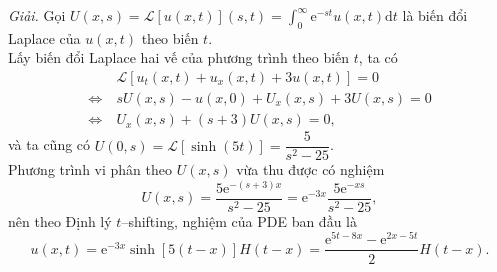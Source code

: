\documentclass[10pt, a4paper]{article}
\begin{document}
	\textit{Giải.} Gọi $U(x,s)=\mathcal L[u(x,t)](s,t)=\displaystyle\int_0^\infty\mathrm e^{-st}u(x,t)\mathrm dt$ là biến đổi Laplace của $u(x,t)$ theo biến $t$.\\
	
	Lấy biến đổi Laplace hai vế của phương trình theo biến $t$, ta có \begin{align*}
		&\mathcal L[u_t(x,t)+u_x(x,t)+3u(x,t)]=0\\
		\Leftrightarrow~&sU(x,s)-u(x,0)+U_x(x,s)+3U(x,s)=0\\
		\Leftrightarrow~&U_x(x,s)+(s+3)U(x,s)=0,
	\end{align*}
	và ta cũng có $U(0,s)=\mathcal L[\sinh(5t)]=\dfrac{5}{s^2-25}$.\\
	
	Phương trình vi phân theo $U(x,s)$ vừa thu được có nghiệm $$U(x,s)=\frac{5\mathrm e^{-(s+3)x}}{s^2-25}=\mathrm e^{-3x}\frac{5\mathrm e^{-xs}}{s^2-25},$$
	nên theo Định lý $t$--shifting, nghiệm của PDE ban đầu là $$u(x,t)=\mathrm e^{-3x}\sinh[5(t-x)]H(t-x)=\frac{\mathrm e^{5t-8x}-\mathrm e^{2x-5t}}{2}H(t-x).$$
\end{document}

